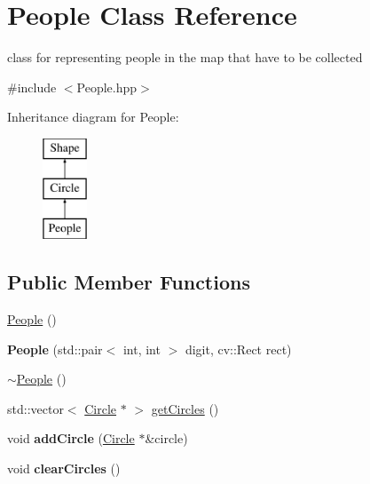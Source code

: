 \hypertarget{class_people}{}\section{People Class Reference}
\label{class_people}


class for representing people in the map that have to be collected  




{\ttfamily \#include $<$People.\+hpp$>$}

Inheritance diagram for People\+:\begin{figure}[H]
\begin{center}
\leavevmode
\includegraphics[height=3.000000cm]{class_people}
\end{center}
\end{figure}
\subsection*{Public Member Functions}
\begin{DoxyCompactItemize}
\item 
\mbox{\hyperlink{class_people_aae1408eddfd15a5007003ecdf1507941}{People}} ()
\item 
\mbox{\label{class_people_abfabd2f2e27a7aa269d404e8f27f903e}} 
{\bfseries People} (std\+::pair$<$ int, int $>$ digit, cv\+::\+Rect rect)
\item 
\mbox{\hyperlink{class_people_adae124857f64dadff4e1801410b3dab2}{$\sim$\+People}} ()
\item 
std\+::vector$<$ \mbox{\hyperlink{class_circle}{Circle}} $\ast$ $>$ \mbox{\hyperlink{class_people_a55604e9d3aa4a772b5d8d97ead9493b0}{get\+Circles}} ()
\item 
\mbox{\label{class_people_a91265f0ac62bb76a6c3995d9228de33f}} 
void {\bfseries add\+Circle} (\mbox{\hyperlink{class_circle}{Circle}} $\ast$\&circle)
\item 
\mbox{\label{class_people_a794c9fff88edec5c1de67cc86950ce52}} 
void {\bfseries clear\+Circles} ()
\end{DoxyCompactItemize}
